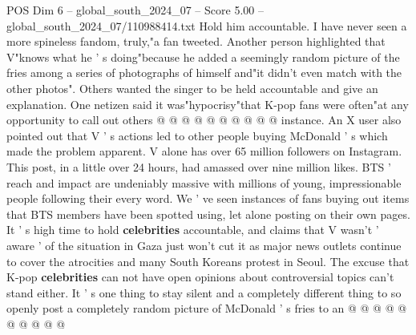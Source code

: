 \begin{textsample}{POS Dim 6 – global\_south\_2024\_07 – Score 5.00 – global\_south\_2024\_07/110988414.txt}
Hold him accountable.
I have never seen a more spineless fandom, truly,"a fan tweeted.
Another person highlighted that V"knows what he ' s doing"because he added a seemingly random picture of the fries among a series of photographs of himself and"it didn't even match with the other photos".
Others wanted the singer to be held accountable and give an explanation.
One netizen said it was"hypocrisy"that K-pop fans were often"at any opportunity to call out others @ @ @ @ @ @ @ @ @ @ instance.
An X user also pointed out that V ' s actions led to other people buying McDonald ' s which made the problem apparent.
V alone has over 65 million followers on Instagram.
This post, in a little over 24 hours, had amassed over nine million likes.
BTS ' reach and impact are undeniably massive with millions of young, impressionable people following their every word.
We ' ve seen instances of fans buying out items that BTS members have been spotted using, let alone posting on their own pages.
It ' s high time to hold \textbf{celebrities} accountable, and claims that V wasn't ' aware ' of the situation in Gaza just won't cut it as major news outlets continue to cover the atrocities and many South Koreans protest in Seoul.
The excuse that K-pop \textbf{celebrities} can not have open opinions about controversial topics can't stand either.
It ' s one thing to stay silent and a completely different thing to so openly post a completely random picture of McDonald ' s fries to an @ @ @ @ @ @ @ @ @ @

\end{textsample}
